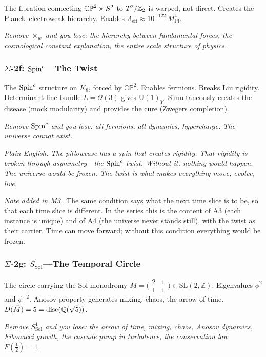 The fibration connecting $\mathbb{CP}^2 \times S^2$ to $T^2/\mathbb{Z}_2$ is warped, not direct.  Creates the Planck--electroweak hierarchy.  Enables $\Lambda_{\mathrm{eff}} \approx 10^{-122}\,M_{\mathrm{Pl}}^4$.

\emph{Remove $\times_w$ and you lose: the hierarchy between fundamental forces, the cosmological constant explanation, the entire scale structure of physics.}

\subsubsection*{$\Sigma$-2f: $\text{Spin}^c$---The Twist}

The $\text{Spin}^c$ structure on $K_8$, forced by $\mathbb{CP}^2$.  Enables fermions.  Breaks Liu rigidity.  Determinant line bundle $L = \mathcal{O}(3)$ gives $\mathrm{U}(1)_Y$.  Simultaneously creates the disease (mock modularity) and provides the cure (Zwegers completion).

\emph{Remove $\text{Spin}^c$ and you lose: all fermions, all dynamics, hypercharge.  The universe cannot exist.}

\emph{Plain English: The pillowcase has a spin that creates rigidity.  That rigidity is broken through asymmetry---the $\text{Spin}^c$ twist.  Without it, nothing would happen.  The universe would be frozen.  The twist is what makes everything move, evolve, live.}

\noindent\emph{Note added in M3.}\ The same condition says what the next time slice is to be, so that each time slice is different. In the series this is the content of A3 (each instance is unique) and of A4 (the universe never stands still), with the twist as their carrier. Time can move forward; without this condition everything would be frozen.

\subsubsection*{$\Sigma$-2g: $S^1_{\mathrm{Sol}}$---The Temporal Circle}

The circle carrying the Sol monodromy $M = \bigl(\begin{smallmatrix} 2 & 1 \\ 1 & 1 \end{smallmatrix}\bigr) \in \mathrm{SL}(2,\mathbb{Z})$.  Eigenvalues $\phi^2$ and $\phi^{-2}$.  Anosov property generates mixing, chaos, the arrow of time.  $D(\tilde{M}) = 5 = \mathrm{disc}(\mathbb{Q}(\sqrt{5}))$.

\emph{Remove $S^1_{\mathrm{Sol}}$ and you lose: the arrow of time, mixing, chaos, Anosov dynamics, Fibonacci growth, the cascade pump in turbulence, the conservation law $F(\tfrac{1}{2}) = 1$.}

